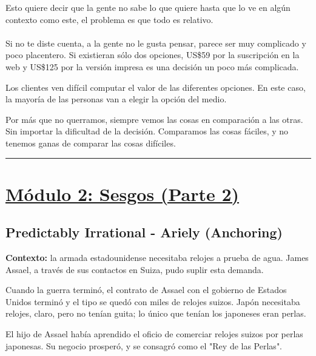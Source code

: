 \documentclass{article}
\newcommand*\sepline{%
  \begin{center}
    \rule[1ex]{.5\textwidth}{.5pt}
  \end{center}}
\begin{document}
            Esto quiere decir que la gente no sabe lo que quiere hasta que lo ve en algún contexto como este, el problema es que todo es relativo.
            \\
            \\
            Si no te diste cuenta, a la gente no le gusta pensar, parece ser muy complicado y poco placentero. Si existieran sólo dos opciones, US\$59 por la suscripción en la web y US\$125 por la versión impresa es una decisión un poco más complicada.

            Los clientes ven difícil computar el valor de las diferentes opciones. En este caso, la mayoría de las personas van a elegir la opción del medio.

            Por más que no querramos, siempre vemos las cosas en comparación a las otras. Sin importar la dificultad de la decisión. Comparamos las cosas fáciles, y no tenemos ganas de comparar las cosas difíciles.

    \sepline

    \section*{\underline{Módulo 2: Sesgos (Parte 2)}}
        \subsection*{Predictably Irrational - Ariely (Anchoring)}
            \textbf{Contexto:} la armada estadounidense necesitaba relojes a prueba de agua. James Assael, a través de sus contactos en Suiza, pudo suplir esta demanda.
            
            Cuando la guerra terminó, el contrato de Assael con el gobierno de Estados Unidos terminó y el tipo se quedó con miles de relojes suizos. Japón necesitaba relojes, claro, pero no tenían guita; lo único que tenían los japoneses eran perlas.

            El hijo de Assael había aprendido el oficio de comerciar relojes suizos por perlas japonesas. Su negocio prosperó, y se consagró como el "Rey de las Perlas".
\end{document}

